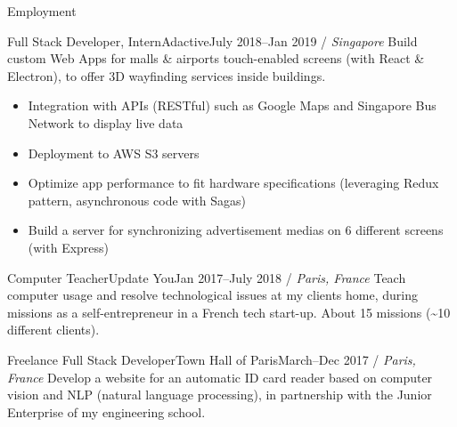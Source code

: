 \documentclass[]{mcdowellcv}
\begin{document}
    \begin{cvsection}{Employment}

        \begin{cvsubsection}{Full Stack Developer, Intern}{Adactive}{July 2018--Jan 2019 / \textit{Singapore}}
            Build custom Web Apps for malls \& airports touch-enabled screens (with React \& Electron), to offer 3D wayfinding services inside buildings.
            \begin{itemize}
                \item Integration with APIs (RESTful) such as Google Maps and Singapore Bus Network to display live data
                \item Deployment to AWS S3 servers
                \item Optimize app performance to fit hardware specifications (leveraging Redux pattern, asynchronous code with Sagas)
                \item Build a server for synchronizing advertisement medias on 6 different screens (with Express)
            \end{itemize}
        \end{cvsubsection}

        \begin{cvsubsection}{Computer Teacher}{Update You}{Jan 2017--July 2018 / \textit{Paris, France}}
            Teach computer usage and resolve technological issues at my clients home, during missions as a self-entrepreneur in a French tech start-up.
            About 15 missions (\textasciitilde 10 different clients).
        \end{cvsubsection}

        \begin{cvsubsection}{Freelance Full Stack Developer}{Town Hall of Paris}{March--Dec 2017 / \textit{Paris, France}}
            Develop a website for an automatic ID card reader based on computer vision and NLP (natural language processing), in partnership with the Junior Enterprise of my engineering school.
        \end{cvsubsection}

    \end{cvsection}
\end{document}
